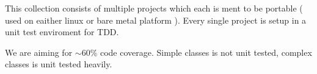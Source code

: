 This collection consists of multiple projects which each is ment to be portable ( used on eaither linux or bare metal platform ). Every single project is setup in a unit test enviroment for T\+DD.

We are aiming for $\sim$60\% code coverage. Simple classes is not unit tested, complex classes is unit tested heavily. 